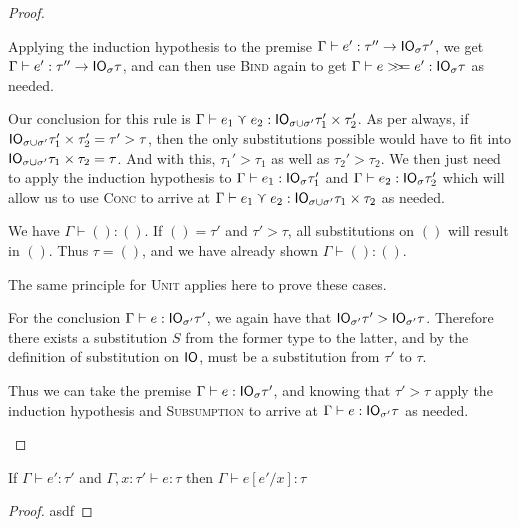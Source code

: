 \begin{proof}
\begin{description}
    Applying the induction hypothesis to the premise $\Gamma \vdash e' : \tau'' \rightarrow \mathsf{IO}_\sigma \tau'$,
    we get $\Gamma \vdash e' : \tau'' \rightarrow \mathsf{IO}_\sigma \tau$, and can then use \textsc{Bind}
    again to get $\Gamma \vdash e >\!\!>\!\!= e' : \mathsf{IO}_\sigma \tau$ as needed.
  \item[\textmd{\boxed{\textsc{Conc}}}]
    Our conclusion for this rule is $\Gamma \vdash e_1 \curlyvee e_2 : \mathsf{IO}_{\sigma \cup \sigma'} \tau_1'
    \times \tau_2'$. As per always, if $\mathsf{IO}_{\sigma \cup \sigma'} \tau_1' \times \tau_2' = \tau' > \tau$,
    then the only substitutions possible would have to fit into
    $\mathsf{IO}_{\sigma \cup \sigma'} \tau_1 \times \tau_2 = \tau$. And with this, $\tau_1' > \tau_1$ as well
    as $\tau_2' > \tau_2$. We then just need to apply the induction
    hypothesis to $\Gamma \vdash e_1 : \mathsf{IO}_\sigma \tau_1'$ and $\Gamma \vdash e_2 : \mathsf{IO}_\sigma \tau_2'$
    which will allow us to use \textsc{Conc} to arrive at $\Gamma \vdash e_1 \curlyvee
    e_2 : \mathsf{IO}_{\sigma \cup \sigma'} \tau_1 \times \tau_2$ as needed.
  \item[\textmd{\boxed{\textsc{Unit}}}]
    We have $\Gamma \vdash () : ()$. If $() = \tau'$ and $\tau' > \tau$, all
    substitutions on $()$ will result in $()$. Thus $\tau = ()$, and we
    have already shown $\Gamma \vdash () : ()$.
  \item[\textmd{\boxed{\textsc{ReadFile}, \textsc{ReadNet}}}]
    The same principle for \textsc{Unit} applies here to prove these
    cases.
  \item[\textmd{\boxed{\textsc{Subsumption}}}]
    For the conclusion $\Gamma \vdash e : \mathsf{IO}_{\sigma'} \tau'$, we again have that
    $\mathsf{IO}_{\sigma'} \tau' > \mathsf{IO}_{\sigma'} \tau$. Therefore there exists a substitution $S$
    from the former type to the latter, and by the definition of
    substitution on $\mathsf{IO}$, must be a substitution from $\tau'$ to $\tau$.

    Thus we can take the premise $\Gamma \vdash e : \mathsf{IO}_\sigma \tau'$, and knowing that
    $\tau' > \tau$ apply the induction hypothesis and \textsc{Subsumption}
    to arrive at $\Gamma \vdash e : \mathsf{IO}_{\sigma'} \tau$ as needed.
  \end{description}
\end{proof}

\begin{lemma}
  If $\Gamma \vdash e' : \tau'$ and $\Gamma, x : \tau' \vdash e : \tau$ then $\Gamma \vdash e [e' / x] : \tau$
  \label{lemma:substitution}
\end{lemma}
\begin{proof}
  asdf
\end{proof}

